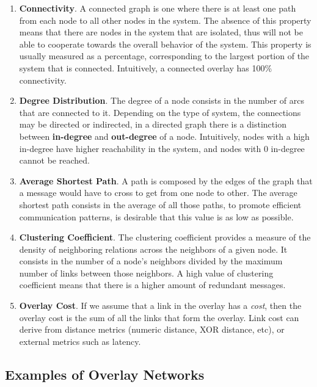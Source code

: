 \begin{enumerate}
    
    \item \textbf{Connectivity}. A connected graph is one where there is at least one path from each node to all other nodes in the system. The absence of this property means that there are nodes in the system that are isolated, thus will not be able to cooperate towards the overall behavior of the system. This property is usually measured as a percentage, corresponding to the largest portion of the system that is connected. Intuitively, a  connected overlay has 100\% connectivity.
    
    \item \textbf{Degree Distribution}. The degree of a node consists in the number of arcs that are connected to it. Depending on the type of system, the connections may be directed or indirected, in a directed graph there is a distinction between \textbf{in-degree} and \textbf{out-degree} of a node. Intuitively, nodes with a high in-degree have higher reachability in the system, and nodes with 0 in-degree cannot be reached.
    
    \item \textbf{Average Shortest Path}. A path is composed by the edges of the graph that a message would have to cross to get from one node to other. The average shortest path consists in the average of all those paths, to promote efficient communication patterns, is desirable that this value is as low as possible.
    
    \item \textbf{Clustering Coefficient}. The clustering coefficient provides a measure of the density of neighboring relations across the neighbors of a given node. It consists in the number of a node's neighbors divided by the maximum number of links between those neighbors. A high value of clustering coefficient means that there is a higher amount of redundant messages.
    
    \item \textbf{Overlay Cost}. If we assume that a link in the overlay has a \textit{cost}, then the overlay cost is the sum of all the links that form the overlay. Link cost can derive from distance metrics (numeric distance, XOR distance, etc), or external metrics such as latency.
    
\end{enumerate}

\subsection{Examples of Overlay Networks}

